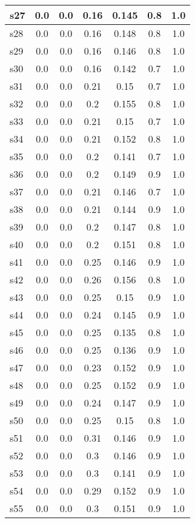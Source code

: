 \documentclass{article}
\begin{document}
\begin{tabular}{|l|c|c|c|c|c|c|}
s27 &0.0 & 0.0 & 0.16 & 0.145 & 0.8 & 1.0\\
\hline
s28 &0.0 & 0.0 & 0.16 & 0.148 & 0.8 & 1.0\\
\hline
s29 &0.0 & 0.0 & 0.16 & 0.146 & 0.8 & 1.0\\
\hline
s30 &0.0 & 0.0 & 0.16 & 0.142 & 0.7 & 1.0\\
\hline
s31 &0.0 & 0.0 & 0.21 & 0.15 & 0.7 & 1.0\\
\hline
s32 &0.0 & 0.0 & 0.2 & 0.155 & 0.8 & 1.0\\
\hline
s33 &0.0 & 0.0 & 0.21 & 0.15 & 0.7 & 1.0\\
\hline
s34 &0.0 & 0.0 & 0.21 & 0.152 & 0.8 & 1.0\\
\hline
s35 &0.0 & 0.0 & 0.2 & 0.141 & 0.7 & 1.0\\
\hline
s36 &0.0 & 0.0 & 0.2 & 0.149 & 0.9 & 1.0\\
\hline
s37 &0.0 & 0.0 & 0.21 & 0.146 & 0.7 & 1.0\\
\hline
s38 &0.0 & 0.0 & 0.21 & 0.144 & 0.9 & 1.0\\
\hline
s39 &0.0 & 0.0 & 0.2 & 0.147 & 0.8 & 1.0\\
\hline
s40 &0.0 & 0.0 & 0.2 & 0.151 & 0.8 & 1.0\\
\hline
s41 &0.0 & 0.0 & 0.25 & 0.146 & 0.9 & 1.0\\
\hline
s42 &0.0 & 0.0 & 0.26 & 0.156 & 0.8 & 1.0\\
\hline
s43 &0.0 & 0.0 & 0.25 & 0.15 & 0.9 & 1.0\\
\hline
s44 &0.0 & 0.0 & 0.24 & 0.145 & 0.9 & 1.0\\
\hline
s45 &0.0 & 0.0 & 0.25 & 0.135 & 0.8 & 1.0\\
\hline
s46 &0.0 & 0.0 & 0.25 & 0.136 & 0.9 & 1.0\\
\hline
s47 &0.0 & 0.0 & 0.23 & 0.152 & 0.9 & 1.0\\
\hline
s48 &0.0 & 0.0 & 0.25 & 0.152 & 0.9 & 1.0\\
\hline
s49 &0.0 & 0.0 & 0.24 & 0.147 & 0.9 & 1.0\\
\hline
s50 &0.0 & 0.0 & 0.25 & 0.15 & 0.8 & 1.0\\
\hline
s51 &0.0 & 0.0 & 0.31 & 0.146 & 0.9 & 1.0\\
\hline
s52 &0.0 & 0.0 & 0.3 & 0.146 & 0.9 & 1.0\\
\hline
s53 &0.0 & 0.0 & 0.3 & 0.141 & 0.9 & 1.0\\
\hline
s54 &0.0 & 0.0 & 0.29 & 0.152 & 0.9 & 1.0\\
\hline
s55 &0.0 & 0.0 & 0.3 & 0.151 & 0.9 & 1.0\\

\end{tabular}
\end{document}
